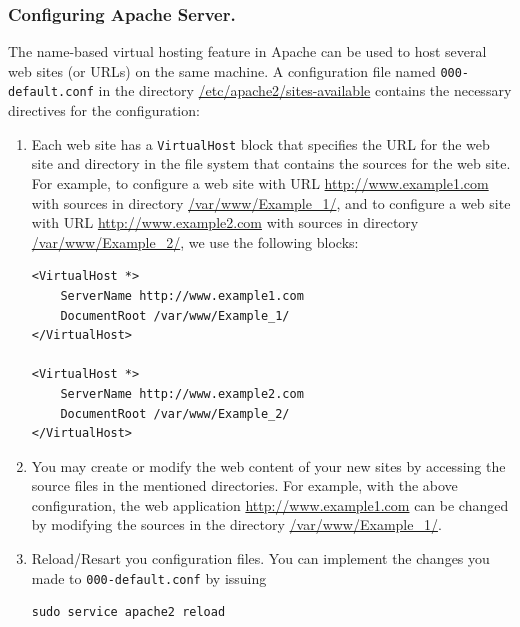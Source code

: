 \documentclass{article}
\begin{document}
\subsubsection{Configuring Apache Server.}
The name-based virtual hosting feature in
Apache can be used to host several web sites (or URLs) on the same
machine. A configuration file named {\tt 000-default.conf} in the directory
\url{/etc/apache2/sites-available} contains the necessary directives for the
configuration:

\begin{enumerate}

\item Each web site has a {\tt VirtualHost} block that specifies the
  URL for the web site and directory in the file system that contains
  the sources for the web site. For example, to configure a web site
  with URL \url{http://www.example1.com} with sources in directory
  \url{/var/www/Example_1/}, and to configure a web site
  with URL \url{http://www.example2.com} with sources in directory
  \url{/var/www/Example_2/},
  we use the following blocks:

\begin{Verbatim}[frame=single]
<VirtualHost *>
    ServerName http://www.example1.com
    DocumentRoot /var/www/Example_1/
</VirtualHost>

<VirtualHost *>
    ServerName http://www.example2.com
    DocumentRoot /var/www/Example_2/
</VirtualHost>
\end{Verbatim}

\item You may create or modify the web content of your new sites by accessing the source files in the
mentioned directories. For example, with the above configuration,
the web application \url{http://www.example1.com} can be changed by modifying
the sources in the directory \url{/var/www/Example_1/}.



\item Reload/Resart you configuration files.  You can implement the changes you made to {\tt 000-default.conf} by issuing

\begin{Verbatim}
sudo service apache2 reload
\end{Verbatim}


\end{enumerate}
\end{document}
